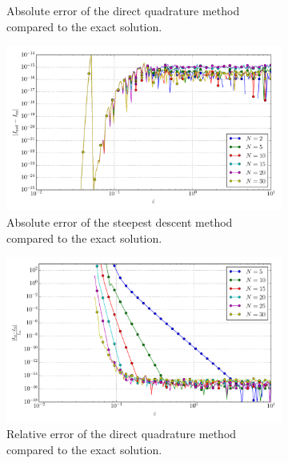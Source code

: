 \documentclass[a4paper,10pt]{article}
\begin{document}
\begin{figure}[ht!]
\begin{subfigure}[t]{0.5\linewidth}
    \caption{Absolute error of the direct quadrature method compared to the exact solution.}
    \label{fig:tp_2d_conv_eps_00_00_err_qr}
  \end{subfigure}
  \begin{subfigure}[t]{0.5\linewidth}
    \includegraphics[width=\linewidth]{./plots/tp_2d_conv_eps_(0,0)_(0,0)_err_nsd.pdf}
    \caption{Absolute error of the steepest descent method compared to the exact solution.}
    \label{fig:tp_2d_conv_eps_00_00_err_nsd}
  \end{subfigure}
  \begin{subfigure}[t]{0.5\linewidth}
    \includegraphics[width=\linewidth]{./plots/tp_2d_conv_eps_(0,0)_(0,0)_err_rel_qr.pdf}
    \caption{Relative error of the direct quadrature method compared to the exact solution.}
    \label{fig:tp_2d_conv_eps_00_00_err_qr}
  \end{subfigure}
  \begin{subfigure}[t]{0.5\linewidth}

\end{subfigure}
\end{figure}
\end{document}
